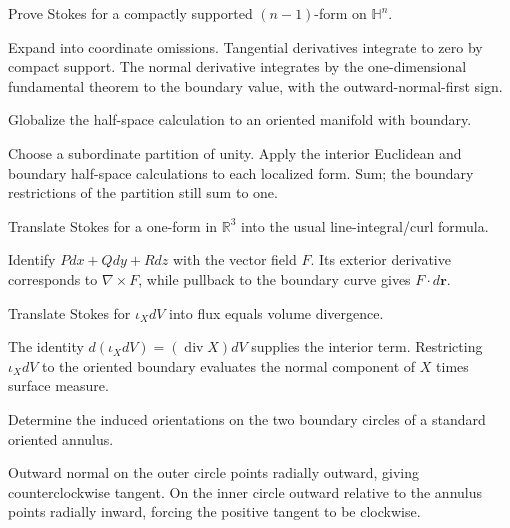 \begin{problem}\label{prob:vii11-04}
Prove Stokes for a compactly supported $(n-1)$-form on $\mathbb H^n$.
\end{problem}
\begin{solution}
Expand into coordinate omissions. Tangential derivatives integrate to zero by compact support. The normal derivative integrates by the one-dimensional fundamental theorem to the boundary value, with the outward-normal-first sign.
\end{solution}

\begin{problem}\label{prob:vii11-05}
Globalize the half-space calculation to an oriented manifold with boundary.
\end{problem}
\begin{solution}
Choose a subordinate partition of unity. Apply the interior Euclidean and boundary half-space calculations to each localized form. Sum; the boundary restrictions of the partition still sum to one.
\end{solution}

\begin{problem}\label{prob:vii11-06}
Translate Stokes for a one-form in $\mathbb R^3$ into the usual line-integral/curl formula.
\end{problem}
\begin{solution}
Identify $Pdx+Qdy+Rdz$ with the vector field $F$. Its exterior derivative corresponds to $\nabla\times F$, while pullback to the boundary curve gives $F\cdot d\mathbf r$.
\end{solution}

\begin{problem}\label{prob:vii11-07}
Translate Stokes for $\iota_XdV$ into flux equals volume divergence.
\end{problem}
\begin{solution}
The identity $d(\iota_XdV)=(\operatorname{div}X)dV$ supplies the interior term. Restricting $\iota_XdV$ to the oriented boundary evaluates the normal component of $X$ times surface measure.
\end{solution}

\begin{problem}\label{prob:vii11-08}
Determine the induced orientations on the two boundary circles of a standard oriented annulus.
\end{problem}
\begin{solution}
Outward normal on the outer circle points radially outward, giving counterclockwise tangent. On the inner circle outward relative to the annulus points radially inward, forcing the positive tangent to be clockwise.
\end{solution}

